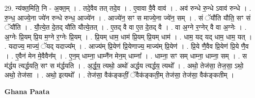 \documentclass[17pt]{extarticle}
\begin{document}
29. न्य॑क्त॒मिति॒ नि - अ॒क्त॒म् । . तदे॒वैव तत् तदे॒व । . ए॒वावा वै॒वै वाव॑ । . अव॑ रुन्धे रु॒न्धे ऽवाव॑ रुन्धे । . रु॒न्ध॒ आज्ये॒ना ज्ये॑न रुन्धे रुन्ध॒ आज्ये॑न । . आज्ये॑न॒ सꣳ स माज्ये॒ना ज्ये॑न॒ सम् । . सं ॅयौ॑ति यौति॒ सꣳ सं ॅयौ॑ति । . यौ॒त्ये॒त दे॒तद् यौ॑ति यौत्ये॒तत् । . ए॒तद् वै वा ए॒त दे॒तद् वै । . वा अ॒ग्ने र॒ग्नेर् वै वा अ॒ग्नेः । . अ॒ग्नेः प्रि॒यम् प्रि॒य म॒ग्ने र॒ग्नेः प्रि॒यम् । . प्रि॒यम् धाम॒ धाम॑ प्रि॒यम् प्रि॒यम् धाम॑ । . धाम॒ यद् यद् धाम॒ धाम॒ यत् । . यदाज्य॒ माज्यं॒ ॅयद् यदाज्य᳚म् । . आज्य॑म् प्रि॒येण॑ प्रि॒येणाज्य॒ माज्य॑म् प्रि॒येण॑ । . प्रि॒ये णै॒वैव प्रि॒येण॑ प्रि॒ये णै॒व । . ए॒वैन॑ मेन मे॒वैवैन᳚म् । . ए॒न॒म् धाम्ना॒ धाम्नै॑न मेन॒म् धाम्ना᳚ । . धाम्ना॒ सꣳ सम् धाम्ना॒ धाम्ना॒ सम् । . स म॑र्द्धय त्यर्द्धयति॒ सꣳ स म॑र्द्धयति । . अ॒र्द्ध॒य॒ त्यथो॒ अथो॑ अर्द्धय त्यर्द्धय॒ त्यथो᳚ । . अथो॒ तेज॑सा॒ तेज॒सा॒ ऽथो॒ अथो॒ तेज॑सा । . अथो॒ इत्यथो᳚ । . तेज॑सा॒ वैक॑ङ्कतीं॒ ॅवैक॑ङ्कती॒म् तेज॑सा॒ तेज॑सा॒ वैक॑ङ्कतीम् । \newline

\textbf{Ghana Paata } \newline
\end{document}
